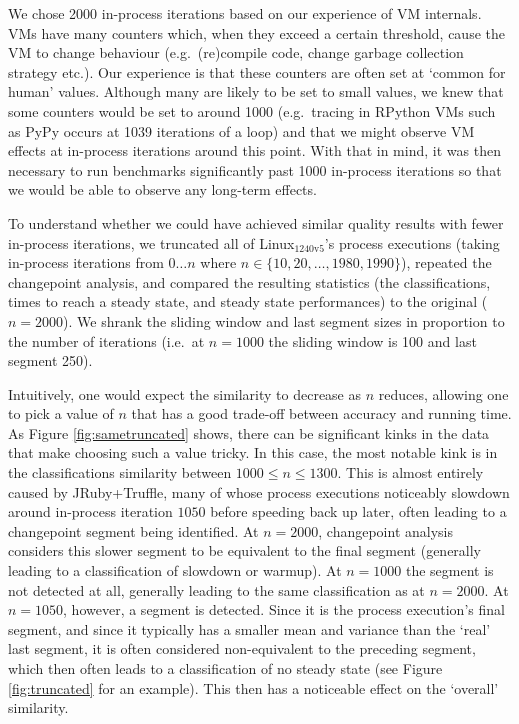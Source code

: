 \documentclass[acmsmall,screen]{acmart}
\newcommand{\bencherseven}{Linux$_\mathrm{1240v5}$\xspace}
\newcommand{\numiterations}{2000\xspace}
\begin{document}
We chose \numiterations in-process iterations based on our experience of VM internals.
VMs have many counters which, when they exceed a certain threshold, cause the VM
to change behaviour (e.g.~(re)compile code, change garbage collection strategy
etc.). Our experience is that these counters are often set at `common for human'
values. Although many are likely to be set to small values, we knew that some
counters would be set to around 1000 (e.g.~tracing in RPython VMs such
as PyPy occurs at 1039 iterations of a loop) and that we might observe VM effects at in-process iterations
around this point. With that in mind, it was then necessary to
run benchmarks significantly past 1000 in-process iterations so that we would
be able to observe any long-term effects.

To understand whether we could have achieved similar quality results with fewer in-process
iterations, we truncated all of \bencherseven's process executions (taking
in-process iterations from $0 \ldots n$ where $n \in \{10, 20, \ldots, 1980, 1990\}$),
repeated the changepoint analysis, and compared the resulting statistics
(the classifications, times to reach a steady state, and steady state performances) to
the original ($n=2000$). We shrank the sliding window and last segment sizes
in proportion to the number of iterations (i.e.~at $n=1000$ the sliding window is 100 and last segment
250).

Intuitively, one would expect the similarity to decrease as $n$ reduces, allowing
one to pick a value of $n$ that has a good trade-off between accuracy and running time.
As Figure \ref{fig:sametruncated} shows, there can be significant
kinks in the data that make choosing such a value tricky. In this case, the most
notable kink is in the classifications similarity between $1000 \leq n \leq
1300$. This is almost entirely caused by JRuby+Truffle, many of whose process
executions noticeably slowdown around in-process iteration $1050$ before
speeding back up later, often leading to a changepoint
segment being identified. At $n=2000$, changepoint analysis considers this slower
segment to be equivalent to the final segment (generally leading to a classification
of slowdown or warmup). At $n=1000$ the segment is not detected at all, generally
leading to the same classification as at $n=2000$. At $n=1050$, however, a
segment is detected. Since it is the process execution's final segment,
and since it typically has a smaller mean and variance than the `real' last
segment, it is often considered non-equivalent to the preceding segment,
which then often leads to a classification of no steady state
(see Figure \ref{fig:truncated} for an example). This then has a noticeable
effect on the `overall' similarity.
\end{document}
